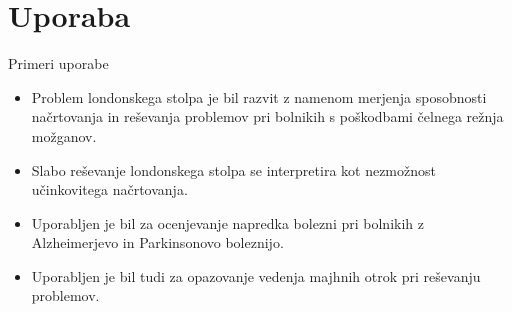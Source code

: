 \documentclass[dvipsnames]{beamer}
\begin{document}
\section{Uporaba}
\begin{frame}{Primeri uporabe}
    \begin{itemize}
        \item Problem londonskega stolpa je bil razvit z namenom merjenja sposobnosti načrtovanja in reševanja problemov pri bolnikih s poškodbami čelnega režnja možganov.
        \item Slabo reševanje londonskega stolpa se interpretira kot nezmožnost učinkovitega načrtovanja.
        \item Uporabljen je bil za ocenjevanje napredka bolezni pri bolnikih z Alzheimerjevo in Parkinsonovo boleznijo.
        \item Uporabljen je bil tudi za opazovanje vedenja majhnih otrok pri reševanju problemov.
    \end{itemize}
\end{frame}
\end{document}
